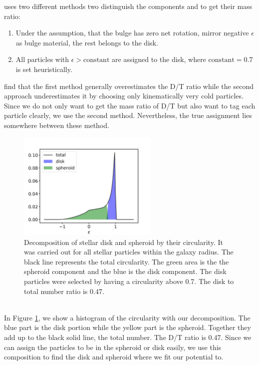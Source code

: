\cite{AurigaGrand} uses two different methods two distinguish the components and to get their mass ratio:
\begin{enumerate}
\item Under the assumption, that the bulge has zero net rotation, mirror negative $\epsilon$ as bulge material, the rest belongs to the disk.
\item All particles with $\epsilon > \mathrm{constant}$ are assigned to the disk, where $\mathrm{constant} = 0.7$ is set heuristically.
\end{enumerate}

\cite{AurigaGrand} find that the first method generally overestimates the \ac{D/T} ratio while the second approach underestimates it by choosing only kinematically very cold particles. Since we do not only want to get the mass ratio of \ac{D/T} but also want to tag each particle clearly, we use the second method. Nevertheless, the true assignment lies somewhere between these method. 
\begin{figure}%
\captionsetup{format=plain}
    \centering
    \includegraphics[width=0.6\textwidth]{plots/Auriga/decomposition_snap_127.png}
\caption{Decomposition of stellar disk and spheroid by their circularity. It was carried out for all stellar particles within the galaxy radius. The black line represents the total circularity. The green area is the the spheroid component and the blue is the disk component. The disk particles were selected by having a circularity above 0.7. The disk to total number ratio is 0.47.}\label{fig:decomposition}
\end{figure}
\\In Figure \ref{fig:decomposition}, we show a histogram of the circularity with our decomposition. The blue part is the disk portion while the yellow part is the spheroid. Together they add up to the black solid line, the total number. The \ac{D/T} ratio is 0.47.
Since we can assign the particles to be in the spheroid or disk easily, we use this composition to find the disk and spheroid where we fit our potential to. 


